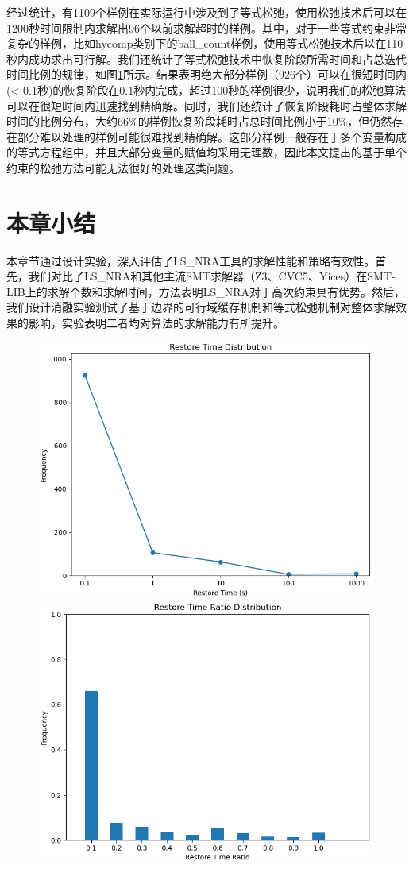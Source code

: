 经过统计，有1109个样例在实际运行中涉及到了等式松弛，使用松弛技术后可以在1200秒时间限制内求解出96个以前求解超时的样例。其中，对于一些等式约束非常复杂的样例，比如hycomp类别下的ball\_count样例，使用等式松弛技术后以在110秒内成功求出可行解。我们还统计了等式松弛技术中恢复阶段所需时间和占总迭代时间比例的规律，如图\ref{fig:restore2}所示。结果表明绝大部分样例（926个）可以在很短时间内(< 0.1秒)的恢复阶段在0.1秒内完成，超过100秒的样例很少，说明我们的松弛算法可以在很短时间内迅速找到精确解。同时，我们还统计了恢复阶段耗时占整体求解时间的比例分布，大约66\%的样例恢复阶段耗时占总时间比例小于10\%，但仍然存在部分难以处理的样例可能很难找到精确解。这部分样例一般存在于多个变量构成的等式方程组中，并且大部分变量的赋值均采用无理数，因此本文提出的基于单个约束的松弛方法可能无法很好的处理这类问题。

\section{本章小结}
本章节通过设计实验，深入评估了LS\_NRA工具的求解性能和策略有效性。首先，我们对比了LS\_NRA和其他主流SMT求解器（Z3、CVC5、Yices）在SMT-LIB上的求解个数和求解时间，方法表明LS\_NRA对于高次约束具有优势。然后，我们设计消融实验测试了基于边界的可行域缓存机制和等式松弛机制对整体求解效果的影响，实验表明二者均对算法的求解能力有所提升。

\begin{figure}[t]
    \centering
    \includegraphics[width=0.45\columnwidth]{Img/restore_time.png}\qquad
    \includegraphics[width=0.45\columnwidth]{Img/restore_ratio.png}
\label{fig:restore2}
\end{figure}

